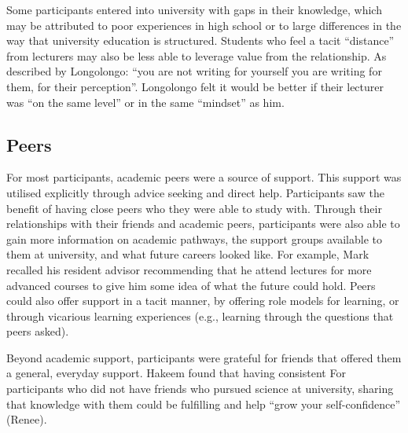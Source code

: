 Some participants entered into university with gaps in their knowledge, which may be attributed to poor experiences in high school or to large differences in the way that university education is structured. Students who feel a tacit ``distance'' from lecturers may also be less able to leverage value from the relationship. As described by Longolongo: ``you are not writing for yourself you are writing for them, for their perception''. Longolongo felt it would be better if their lecturer was ``on the same level'' or in the same ``mindset'' as him. 



\subsection{Peers}
For most participants, academic peers were a source of support. This support was utilised explicitly through advice seeking and direct help. Participants saw the benefit of having close peers who they were able to study with. Through their relationships with their friends and academic peers, participants were also able to gain more information on academic pathways, the support groups available to them at university, and what future careers looked like. For example, Mark recalled his resident advisor recommending that he attend lectures for more advanced courses to give him some idea of what the future could hold. Peers could also offer support in a tacit manner, by offering role models for learning, or through vicarious learning experiences (e.g., learning through the questions that peers asked). 

Beyond academic support, participants were grateful for friends that offered them a general, everyday support. Hakeem found that having  consistent For participants who did not have friends who pursued science at university, sharing that knowledge with them could be fulfilling and help ``grow your self-confidence'' (Renee).



